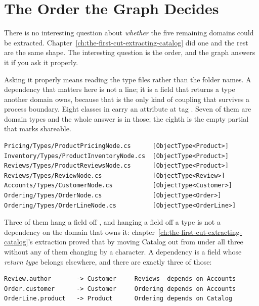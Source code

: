 \section{The Order the Graph Decides}
\label{sec:ch12-the-order-the-graph-decides}
%

There is no interesting question about \emph{whether} the five remaining domains
could be extracted. Chapter~\ref{ch:the-first-cut-extracting-catalog} did one and
the rest are the same shape. The interesting question is the order, and the graph
answers it if you ask it properly.

%
Asking it properly means reading the type files rather than the folder names. A
dependency that matters here is not a  line; it is a field that
returns a type another domain owns, because that is the only kind of coupling
that survives a process boundary. Eight classes in  carry an
\code{[ObjectType<T>]} attribute at tag . Seven of them are domain
types and the whole answer is in those; the eighth is the empty partial that
marks  shareable.

\begin{verbatim}
Pricing/Types/ProductPricingNode.cs      [ObjectType<Product>]
Inventory/Types/ProductInventoryNode.cs  [ObjectType<Product>]
Reviews/Types/ProductReviewsNode.cs      [ObjectType<Product>]
Reviews/Types/ReviewNode.cs              [ObjectType<Review>]
Accounts/Types/CustomerNode.cs           [ObjectType<Customer>]
Ordering/Types/OrderNode.cs              [ObjectType<Order>]
Ordering/Types/OrderLineNode.cs          [ObjectType<OrderLine>]
\end{verbatim}

Three of them hang a field off , and hanging a field off a type is
not a dependency on the domain that owns it:
chapter~\ref{ch:the-first-cut-extracting-catalog}'s extraction proved that by
moving Catalog out from under all three without any of them changing by a
character. A dependency is a field whose \emph{return type} belongs elsewhere,
and there are exactly three of those:

\begin{verbatim}
Review.author       -> Customer     Reviews  depends on Accounts
Order.customer      -> Customer     Ordering depends on Accounts
OrderLine.product   -> Product      Ordering depends on Catalog
\end{verbatim}

